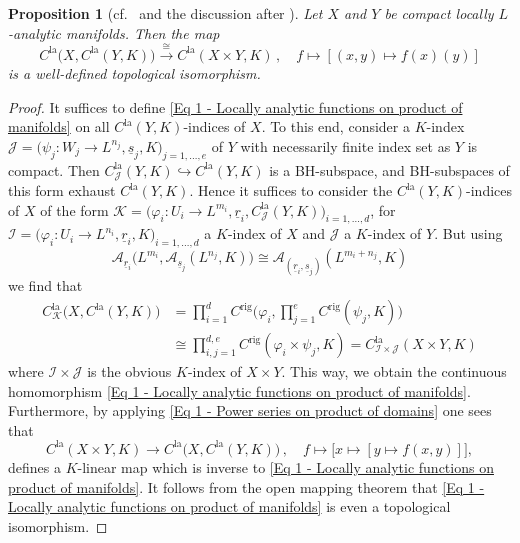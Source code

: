 \documentclass[a4paper, reqno, 10pt]{amsart}
\newtheorem{proposition}[theorem]{Proposition}
\theoremstyle{definition}
\numberwithin{equation}{section}
\newcommand{\la}{{\mathrm{la}}}
\newcommand{\lra}{\longrightarrow}
\newcommand{\lto}{\longmapsto}
\newcommand{\mto}{\mapsto}
\newcommand{\ra}{\rightarrow}
\newcommand{\ul}[1]{{\underline{#1}}}
\newcommand{\CA}{{\mathcal {A}}}
\newcommand{\CI}{{\mathcal {I}}}
\newcommand{\CJ}{{\mathcal {J}}}
\newcommand{\CK}{{\mathcal {K}}}
\newcommand{\aan}{{\mathrm{rig}}}
\begin{document}
\begin{proposition}[{cf.\ \cite[Lemma A.1]{SchneiderTeitelbaum05DualAdmLocAnRep} and the discussion after \cite[Thm.\ 12.2]{SchneiderTeitelbaum04ContLocAnRepThLectHangzhou}}]\label{Prop 1 - Locally analytic functions on product of manifolds}
	Let $X$ and $Y$ be compact locally $L$-analytic manifolds.
	Then the map
	\begin{equation}\label{Eq 1 - Locally analytic functions on product of manifolds}
		C^\la \big(X , C^\la(Y,K) \big) \overset{\cong}{\lra} C^\la(X\times Y,K) \,, \quad f \lto \left[(x,y) \mto f(x)(y)\right]
	\end{equation}
	is a well-defined topological isomorphism.
\end{proposition}
\begin{proof}
	It suffices to define \eqref{Eq 1 - Locally analytic functions on product of manifolds} on all $C^\la(Y,K)$-indices of $X$.
	To this end, consider a $K$-index $\CJ= \big(\psi_j \colon W_j \ra L^{n_j}, \ul{s}_j, K \big)_{j=1,\ldots,e}$ of $Y$ with necessarily finite index set as $Y$ is compact.
	Then $C^\la_\CJ (Y,K) \hookrightarrow C^\la(Y,K)$ is a BH-subspace, and BH-subspaces of this form exhaust $C^\la(Y,K)$.
	Hence it suffices to consider the $C^\la(Y,K)$-indices of $X$ of the form $\CK = \big(\varphi_i \colon U_i \ra L^{m_i},\ul{r}_i, C^\la_\CJ(Y,K) \big)_{i=1,\ldots,d}$, for $\CI = \big(\varphi_i\colon U_i \ra L^{n_i},\ul{r}_i, K \big)_{i=1,\ldots,d}$ a $K$-index of $X$ and $\CJ$ a $K$-index of $Y$.
	But using 
	\begin{equation}\label{Eq 1 - Power series on product of domains}
		\CA_{\ul{r}_i} \big(L^{m_i}, \CA_{\ul{s}_j}(L^{n_j},K) \big) \cong \CA_{(\ul{r}_i,\ul{s}_j)}(L^{m_i+n_j},K)
	\end{equation}
	we find that
	\begin{align*}
		C^\la_\CK \big(X, C^\la(Y,K) \big) &= \prod_{i=1}^d C^\aan \bigg(\varphi_i, \prod_{j=1}^e C^\aan (\psi_j , K) \bigg) \\
		&\cong \prod_{i,j=1}^{d,e} C^\aan (\varphi_i \times \psi_j ,K)  = C^\la_{\CI \times \CJ}(X \times Y, K)
	\end{align*}
	where $\CI \times \CJ$ is the obvious $K$-index of $X\times Y$.
	This way, we obtain the continuous homomorphism \eqref{Eq 1 - Locally analytic functions on product of manifolds}.
	Furthermore, by applying \eqref{Eq 1 - Power series on product of domains} one sees that
	\begin{equation*}
		C^\la(X\times Y, K) \lra C^\la \big(X,C^\la(Y,K) \big) \,,\quad f \lto \big[ x \mto \left[y \mto f(x,y) \right] \big] ,
	\end{equation*}
	defines a $K$-linear map which is inverse to \eqref{Eq 1 - Locally analytic functions on product of manifolds}.
	It follows from the open mapping theorem \cite[Thm.\ 1.1.17]{Emerton17LocAnVect} that \eqref{Eq 1 - Locally analytic functions on product of manifolds} is even a topological isomorphism.
\end{proof}
\end{document}
